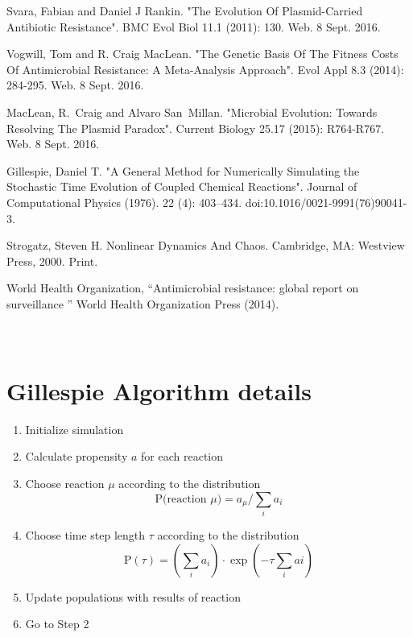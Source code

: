 \documentclass[numbib]{buthesis_p}  %
\begin{document}
\newpage
\begin{thebibliography}{99}

 Svara, Fabian and Daniel J Rankin. "The Evolution Of Plasmid-Carried Antibiotic Resistance".
BMC Evol Biol 11.1 (2011): 130. Web. 8 Sept. 2016.

 Vogwill, Tom and R. Craig MacLean. "The Genetic Basis Of %
The Fitness Costs Of Antimicrobial Resistance: A Meta-Analysis Approach". Evol Appl 8.3 (2014): 284-295. Web. 8 Sept. 2016.

 MacLean, R. Craig and Alvaro San Millan.
"Microbial Evolution: Towards Resolving The Plasmid Paradox". Current Biology 25.17 (2015): R764-R767. Web. 8 Sept. 2016.

 Gillespie, Daniel T.
"A General Method for Numerically Simulating the Stochastic Time Evolution of Coupled Chemical Reactions".
Journal of Computational Physics (1976). 22 (4): 403–434. doi:10.1016/0021-9991(76)90041-3.


 Strogatz, Steven H. Nonlinear Dynamics And Chaos.
Cambridge, MA: Westview Press, 2000. Print.

 World Health Organization, ``Antimicrobial resistance: global report on surveillance ''
World Health Organization Press (2014).

\end{thebibliography}


\newpage
\appendix
\section{\\Gillespie Algorithm details} \label{algDetails}

\begin{enumerate}
  \item Initialize simulation
  \item Calculate propensity $a$ for each reaction
  \item Choose reaction $\mu$ according to the distribution
    $$\text{P(reaction }\mu) = a_\mu / \sum_{i}a_i$$ %
  \item Choose time step length $\tau$ according to the distribution
    $$\text{P}(\tau)=\left(\sum_i a_i\right) \cdot \exp{\left(-\tau \sum_i ai\right)}$$
  \item Update populations with results of reaction
  \item Go to Step 2
\end{enumerate}
\newpage
\end{document}
